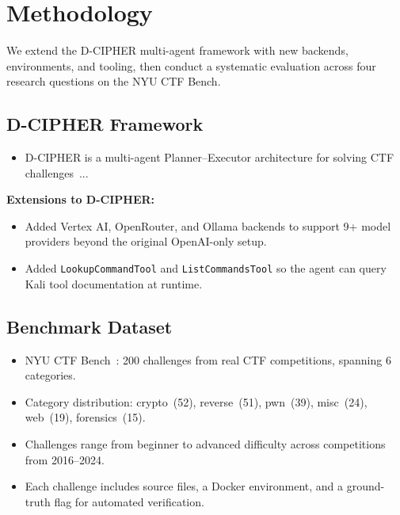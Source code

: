 \documentclass[conference]{IEEEtran}
\begin{document}
\section{Methodology}

We extend the D-CIPHER multi-agent framework with new backends, environments, and tooling, then conduct a systematic evaluation across four research questions on the NYU CTF Bench.

\subsection{D-CIPHER Framework}

\begin{itemize}
  \item D-CIPHER is a multi-agent Planner--Executor architecture for solving CTF challenges~\cite{dcipher}... 
\end{itemize}
\noindent\textbf{Extensions to D-CIPHER:}
\begin{itemize}
  \item Added Vertex AI, OpenRouter, and Ollama backends to support 9+ model providers beyond the original OpenAI-only setup.
  \item Added \texttt{LookupCommandTool} and \texttt{ListCommandsTool} so the agent can query Kali tool documentation at runtime.
\end{itemize}


\subsection{Benchmark Dataset}

\begin{itemize}
  \item NYU CTF Bench~\cite{nyuctfbench}: 200 challenges from real CTF competitions, spanning 6 categories.
  \item Category distribution: crypto~(52), reverse~(51), pwn~(39), misc~(24), web~(19), forensics~(15).
  \item Challenges range from beginner to advanced difficulty across competitions from 2016--2024.
  \item Each challenge includes source files, a Docker environment, and a ground-truth flag for automated verification.
\end{itemize}

\end{document}
